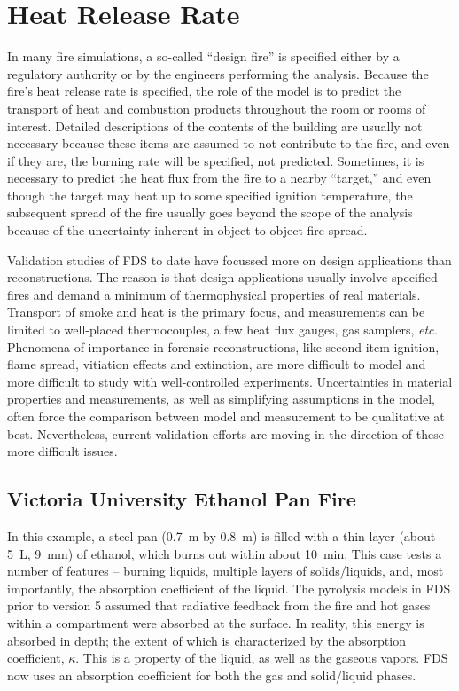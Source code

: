\chapter{Heat Release Rate}

In many fire simulations, a  so-called  ``design  fire'' is  specified
either by  a regulatory authority  or by the engineers  performing the
analysis. Because the  fire's heat release rate is  specified, the role of
the model is to predict  the transport of heat and combustion products
throughout  the room or  rooms of  interest. Detailed  descriptions of  the
contents of the building are usually not necessary because these items
are assumed to not contribute to the fire,  and even if they are, the burning rate
will be specified, not predicted.  Sometimes, it is necessary  to predict
the heat  flux from the fire  to a nearby ``target,''  and even though
the target  may heat up  to some specified ignition  temperature, the
subsequent spread  of the  fire usually goes  beyond the scope  of the
analysis because of the uncertainty  inherent in object to object fire
spread.

Validation  studies  of FDS  to  date  have  focussed more  on  design
applications   than  reconstructions.  The   reason  is   that  design
applications usually involve specified  fires and demand a minimum of
thermophysical properties  of real materials.  Transport  of smoke and
heat  is  the  primary  focus,  and measurements  can  be  limited  to
well-placed thermocouples, a few  heat flux gauges, gas samplers, {\em
etc.} Phenomena of importance in forensic reconstructions, like second
item  ignition, flame  spread, vitiation  effects and  extinction, are
more   difficult  to   model  and   more  difficult   to   study  with
well-controlled experiments. Uncertainties  in material properties and
measurements, as  well as simplifying assumptions in  the model, often
force the  comparison between model and measurement  to be qualitative
at best.  Nevertheless, current validation  efforts are moving  in the
direction of these more difficult issues.



\section{Victoria University Ethanol Pan Fire}
\label{ethanol_pan}

In this example, a steel pan (0.7~m by 0.8~m) is filled with a thin layer (about 5~L, 9~mm) of ethanol, which burns out within about 10~min. This case tests a number of features -- burning
liquids, multiple layers of solids/liquids, and, most importantly, the absorption coefficient of the liquid. The pyrolysis models in FDS prior to version 5
assumed that radiative feedback from the fire and hot gases within a compartment were absorbed at the surface. In reality, this energy is absorbed in
depth; the extent of which is characterized by the absorption coefficient, $\kappa$. This is a property of the liquid, as well as the gaseous vapors. FDS now uses
an absorption coefficient for both the gas and solid/liquid phases. 

